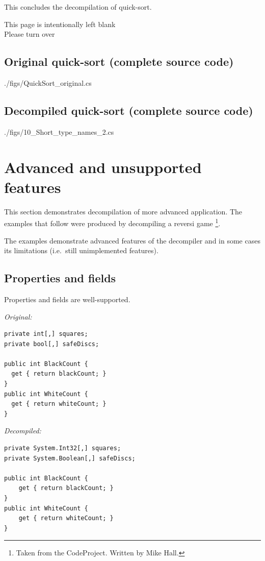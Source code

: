 \documentclass[12pt,twoside,notitlepage]{report}
\begin{document}
This concludes the decompilation of quick-sort.

\clearpage

{\vspace*{60mm} \centering This page is intentionally left blank\\ Please turn over \newpage}


\subsection{Original quick-sort (complete source code)}
\label{Original quick-sort}

{./figs/QuickSort_original.cs}

\newpage

\subsection{Decompiled quick-sort (complete source code)}
\label{Decompiled quick-sort}

{./figs/10_Short_type_names_2.cs}


\section{Advanced and unsupported features}

This section demonstrates decompilation of more advanced application. 
The examples that follow were produced by decompiling a reversi game%
\footnote{Taken from the CodeProject.  Written by Mike Hall.}.

The examples demonstrate advanced features of the decompiler
and in some cases its limitations (i.e.\ still unimplemented features).




\subsection{Properties and fields}

Properties and fields are well-supported.

\emph{Original:}
\begin{verbatim}
private int[,] squares;
private bool[,] safeDiscs;

public int BlackCount {
  get { return blackCount; }
}
public int WhiteCount {
  get { return whiteCount; }
}
\end{verbatim}

\emph{Decompiled:}
\begin{verbatim}
private System.Int32[,] squares;
private System.Boolean[,] safeDiscs;

public int BlackCount {
    get { return blackCount; }
}
public int WhiteCount {
    get { return whiteCount; }
}
\end{verbatim}
\end{document}
